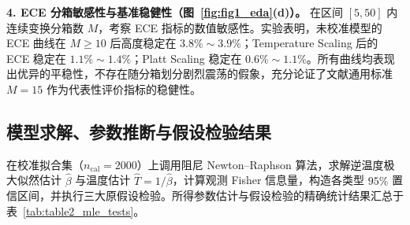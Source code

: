 \textbf{4. ECE 分箱敏感性与基准稳健性（图~\ref{fig:fig1_eda}(d)）。}
在区间 $[5, 50]$ 内连续变换分箱数 $M$，考察 ECE 指标的数值敏感性。实验表明，未校准模型的 ECE 曲线在 $M \ge 10$ 后高度稳定在 $3.8\% \sim 3.9\%$；Temperature Scaling 后的 ECE 稳定在 $1.1\% \sim 1.4\%$；Platt Scaling 稳定在 $0.6\% \sim 1.1\%$。所有曲线均表现出优异的平稳性，不存在随分箱划分剧烈震荡的假象，充分论证了文献通用标准 $M = 15$ 作为代表性评价指标的稳健性。

\subsection{模型求解、参数推断与假设检验结果}

在校准拟合集（$n_{\mathrm{cal}} = 2000$）上调用阻尼 Newton--Raphson 算法，求解逆温度极大似然估计 $\hat\beta$ 与温度估计 $\hat T = 1/\hat\beta$，计算观测 Fisher 信息量，构造各类型 $95\%$ 置信区间，并执行三大原假设检验。所得参数估计与假设检验的精确统计结果汇总于表~\ref{tab:table2_mle_tests}。

